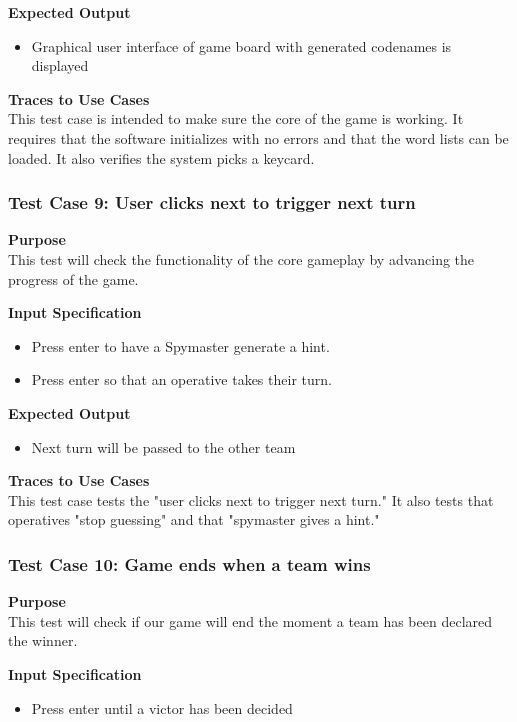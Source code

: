 \documentclass[12pt]{article}
\begin{document}
\noindent
{\bf Expected Output}
\begin{itemize}
    \item Graphical user interface of game board with generated codenames is displayed
\end{itemize}

\noindent
{\bf Traces to Use Cases}\\
This test case is intended to make sure the core of the game is working. It requires that the software initializes with no errors and that the word lists can be loaded. It also verifies the system picks a keycard.


\subsubsection{Test Case 9: User clicks next to trigger next turn} \label{tc:2}

\noindent
{\bf Purpose}\\
This test will check the functionality of the core gameplay by advancing the progress of the game.

\noindent
{\bf Input Specification}
\begin{itemize}
    \item Press enter to have a Spymaster generate a hint.
    \item Press enter so that an operative takes their turn.
\end{itemize}

\noindent
{\bf Expected Output}
\begin{itemize}
    \item Next turn will be passed to the other team
\end{itemize}

\noindent
{\bf Traces to Use Cases}\\
This test case tests the "user clicks next to trigger next turn." It also tests that operatives "stop guessing" and that "spymaster gives a hint."

\subsubsection{Test Case 10: Game ends when a team wins} \label{tc:2}

\noindent
{\bf Purpose}\\
This test will check if our game will end the moment a team has been declared the winner.

\noindent
{\bf Input Specification}
\begin{itemize}
    \item Press enter until a victor has been decided
\end{itemize}
\end{document}
